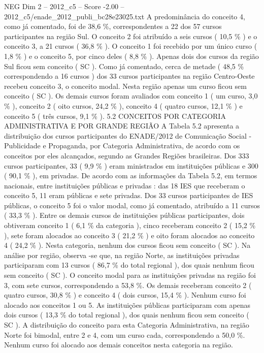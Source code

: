 \begin{textsample}{NEG Dim 2 – 2012\_c5 – Score -2.00 – 2012\_c5/enade\_2012\_publi\_bc28e23025.txt}
A predominância do conceito 4, como já comentado, foi de 38,6 \%, correspondentes a 22 dos 57 cursos participantes na região Sul.
O conceito 2 foi atribuído a seis cursos ( 10,5 \% ) e o conceito 3, a 21 cursos ( 36,8 \% ).
O conceito 1 foi recebido por um único curso ( 1,8 \% ) e o conceito 5, por cinco deles ( 8,8 \% ).
Apenas dois dos cursos da região Sul ficou sem conceito ( SC ).
Como já comentado, cerca de metade ( 48,5 \% correspondendo a 16 cursos ) dos 33 cursos participantes na região Centro-Oeste recebeu conceito 3, o conceito modal.
Nesta região apenas um curso ficou sem conceito ( SC ).
Os demais cursos foram avaliados com conceito 1 ( um curso, 3,0 \% ), conceito 2 ( oito cursos, 24,2 \% ), conceito 4 ( quatro cursos, 12,1 \% ) e conceito 5 ( três cursos, 9,1 \% ). 5.2 CONCEITOS POR CATEGORIA ADMINISTRATIVA E POR GRANDE REGIÃO A Tabela 5.2 apresenta a distribuição dos cursos participantes do ENADE/2012 de Comunicação Social - Publicidade e Propaganda, por Categoria Administrativa, de acordo com os conceitos por eles alcançados, segundo as Grandes Regiões brasileiras.
Dos 333 cursos participantes, 33 ( 9,9 \% ) eram ministrados em instituições públicas e 300 ( 90,1 \% ), em privadas.
De acordo com as informações da Tabela 5.2, em termos nacionais, entre instituições públicas e privadas : das 18 IES que receberam o conceito 5, 11 eram públicas e sete privadas.
Dos 33 cursos participantes de IES públicas, o conceito 5 foi o valor modal, como já comentado, atribuído a 11 cursos ( 33,3 \% ).
Entre os demais cursos de instituições públicas participantes, dois obtiveram conceito 1 ( 6,1 \% da categoria ), cinco receberam conceito 2 ( 15,2 \% ), sete foram alocados ao conceito 3 ( 21,2 \% ) e oito foram alocados ao conceito 4 ( 24,2 \% ).
Nesta categoria, nenhum dos cursos ficou sem conceito ( SC ).
Na análise por região, observa -se que, na região Norte, as instituições privadas participaram com 13 cursos ( 86,7 \% do total regional ), dos quais nenhum ficou sem conceito ( SC ).
O conceito modal para as instituições privadas na região foi 3, com sete cursos, correspondendo a 53,8 \%.
Os demais receberam conceito 2 ( quatro cursos, 30,8 \% ) e conceito 4 ( dois cursos, 15,4 \% ).
Nenhum curso foi alocado aos conceitos 1 ou 5.
As instituições públicas participaram com apenas dois cursos ( 13,3 \% do total regional ), dos quais nenhum ficou sem conceito ( SC ).
A distribuição do conceito para esta Categoria Administrativa, na região Norte foi bimodal, entre 2 e 4, com um curso cada, correspondendo a 50,0 \%.
Nenhum curso foi alocado aos demais conceitos nesta categoria na região.

\end{textsample}
